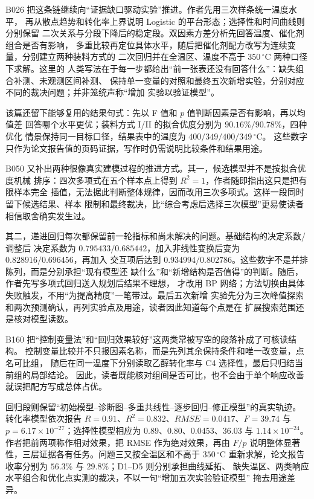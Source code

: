 B026 把这条链继续向“证据缺口驱动实验”推进。作者先用三次样条统一温度水平，
再从散点趋势和转化率上界说明 Logistic 的平台形态；选择性和时间曲线则分别保留
二次关系与分段下降后的稳定段。双因素方差分析先回答温度、催化剂组合是否有影响，
多重比较再定位具体水平，随后把催化剂配方改写为连续变量，分别建立两种装料方式的
二次回归并在全温区、温度不高于 $350\,^{\circ}\mathrm{C}$ 两种口径下求解。这里的
人类写法在于每一步都给出“前一张表还没有回答什么”：缺失组合补测、未观测区间补测、
保持单一变量的对照和最终五次新增实验，分别对应不同的裁决问题；并非笼统声称“增加
实验以验证模型”。

该篇还留下能够复用的结果句式：先以 F 值和 $p$ 值判断因素是否有影响，再以均值差
回答哪个水平更优；装料方式 I/II 的拟合优度分别为 $90.16\%/90.78\%$，四种优化
情景保持同一目标口径，结果表中的温度为 $400/349/400/349\,^{\circ}\mathrm{C}$。
这些数字只作为论文报告值的页码证据，写作时仍需说明比较条件和结果用途。

B050 又补出两种很像真实建模过程的推进方式。其一，候选模型并不是按拟合优度机械
排序：四次多项式在五个样本点上得到 $R^2=1$，作者随即指出这只是把有限样本完全
插值，无法据此判断整体规律，因而改用三次多项式。这样一段同时留下候选结果、样本
限制和最终裁决，比“综合考虑后选择三次模型”更易使读者相信取舍确实发生过。

其二，递进回归每次都保留前一轮指标和尚未解决的问题。基础结构的决定系数/调整后
决定系数为 $0.795433/0.685442$，加入非线性变换后变为 $0.828916/0.696456$，再加入
交互项后达到 $0.934994/0.802786$。这些数字不是并排陈列，而是分别承担“现有模型还
缺什么”和“新增结构是否值得”的判断。随后，作者先写多项式回归送入规划后结果不理想，
才改用 BP 网络；方法切换由具体失败触发，不用“为提高精度”一笔带过。最后五次新增
实验先分为三次峰值探索和两次预测确认，再列实验点及用途，读者因此知道每个点是在
扩展搜索范围还是核对模型读数。

B160 把“控制变量法”和“回归效果较好”这两类常被写空的段落补成了可核读结构。
控制变量比较并不只报因素名称，而是先列其余保持条件和唯一改变量，点名可比组，
随后在同一温度下分别读取乙醇转化率与 C4 选择性，最后只归结当前组的局部结论。
因此，读者既能核对组间是否可比，也不会由于单个响应改善就误把配方写成总体占优。

回归段则保留“初始模型--诊断图--多重共线性--逐步回归--修正模型”的真实轨迹。
转化率模型依次报告 $R=0.91$、$R^2=0.832$、$RMSE=0.0417$、$F=39.74$ 与
$p=6.17\times10^{-27}$；选择性模型相应为 $0.89$、$0.80$、$0.0453$、$36.03$ 与
$1.14\times10^{-24}$。作者把前两项称作相对效果，把 RMSE 作为绝对效果，再由 $F/p$
说明整体显著性，三层证据各有任务。问题三又按全温区和不高于 $350\,^{\circ}\mathrm{C}$
重新求解，论文报告收率分别为 $56.3\%$ 与 $29.8\%$；D1--D5 则分别承担曲线延拓、
缺失温区、两类响应水平组合和优化点实测的裁决，不以一句“增加五次实验验证模型”
掩去用途差异。

